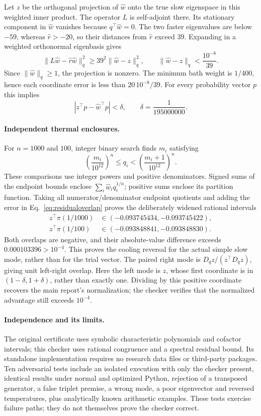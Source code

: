 \documentclass[11pt]{article}
\begin{document}
Let $z$ be the orthogonal projection of $\widehat w$ onto the true slow eigenspace in this weighted inner product. The operator $L$ is self-adjoint there. Its stationary component in $\widehat w$ vanishes because $q^\top\widehat w=0$. The two faster eigenvalues are below $-59$, whereas $\widehat r>-20$, so their distances from $\widehat r$ exceed $39$. Expanding in a weighted orthonormal eigenbasis gives
\[
\|L\widehat w-\widehat r\widehat w\|_q^2
\geq39^2\|\widehat w-z\|_q^2,
\qquad
\|\widehat w-z\|_q<\frac{10^{-8}}{39}.
\]
Since $\|\widehat w\|_q\geq1$, the projection is nonzero. The minimum bath weight is $1/400$, hence each coordinate error is less than $20\,10^{-8}/39$. For every probability vector $p$ this implies
\begin{equation}\label{eq:residualoverlap}
|z^\top p-\widehat w^\top p|<\delta,
\qquad \delta=\frac1{195000000}.
\end{equation}

\paragraph{Independent thermal enclosures.}
For $n=1000$ and $100$, integer binary search finds $m_i$ satisfying
\[
\left(\frac{m_i}{10^{12}}\right)^n\leq q_i
<\left(\frac{m_i+1}{10^{12}}\right)^n.
\]
These comparisons use integer powers and positive denominators. Signed sums of the endpoint bounds enclose $\sum_i\widehat w_iq_i^{1/n}$; positive sums enclose its partition function. Taking all numerator/denominator endpoint quotients and adding the error in Eq.~\eqref{eq:residualoverlap} proves the deliberately widened rational intervals
\begin{align*}
z^\top\pi(1/1000)&\in(-0.093745434,-0.093745422),\\
z^\top\pi(1/100)&\in(-0.093848841,-0.093848830).
\end{align*}
Both overlaps are negative, and their absolute-value difference exceeds $0.000103396>10^{-4}$. This proves the cooling reversal for the actual simple slow mode, rather than for the trial vector. The paired right mode is $D_qz/(z^\top D_qz)$, giving unit left-right overlap. Here the left mode is $z$, whose first coordinate is in $(1-\delta,1+\delta)$, rather than exactly one. Dividing by this positive coordinate recovers the main report's normalization; the checker verifies that the normalized advantage still exceeds $10^{-4}$.

\paragraph{Independence and its limits.}
The original certificate uses symbolic characteristic polynomials and cofactor intervals; this checker uses rational congruence and a spectral residual bound. Its standalone implementation requires no research data files or third-party packages. Ten adversarial tests include an isolated execution with only the checker present, identical results under normal and optimized Python, rejection of a transposed generator, a false triplet premise, a wrong mode, a poor eigenvector and reversed temperatures, plus analytically known arithmetic examples. These tests exercise failure paths; they do not themselves prove the checker correct.
\end{document}
